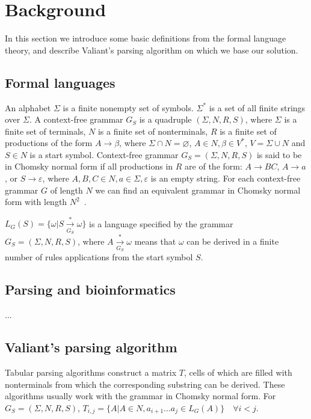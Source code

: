 \section{Background}

In this section we introduce some basic definitions from the formal language theory, and describe Valiant's parsing algorithm on which we base our solution.

\subsection{Formal languages}

An alphabet $\Sigma$ is a finite nonempty set of symbols.
$\Sigma^{*}$ is a set of all finite strings over $\Sigma$.
A context-free grammar $G_S$ is a quadruple $(\Sigma, N, R, S)$, where $\Sigma$ is a finite set of terminals, $N$ is a finite set of nonterminals, $R$ is a finite set of productions of the form $A \rightarrow \beta$, where $\Sigma \cap N = \varnothing$, $A \in N, \beta \in V^{*}$, $V = \Sigma \cup N$ and $S \in N$ is a start symbol.
Context-free grammar $G_S = (\Sigma, N, R, S)$ is said to be in Chomsky normal form if all productions in $R$ are of the form: $A \rightarrow BC$, $A \rightarrow a$, or $S \rightarrow \varepsilon$, where $A, B, C \in N, a \in \Sigma, \varepsilon$ is an empty string.
For each context-free grammar $G$ of length $N$ we can find an equivalent grammar in Chomsky normal form with length $N^2$~\cite{hopcroft2008introduction}.

$L_{G}(S) = \{ \omega | S\xrightarrow[G_S]{*} \omega\}$ is a language specified by the grammar $G_{S} = (\Sigma, N, R, S)$, where $A \xrightarrow[G_S]{*} \omega$ means that $\omega$ can be derived in a finite number of rules applications from the start symbol $S$.

\subsection{Parsing and bioinformatics}

...

\subsection{Valiant's parsing algorithm}

Tabular parsing algorithms construct a matrix $T$, cells of which are filled with nonterminals from which the corresponding substring can be derived. 
These algorithms usually work with the grammar in Chomsky normal form.
For $G_S=(\Sigma, N, R, S)$, $T_{i, j} =  \{ A | A \in N, a_{i + 1} \dots a_{j} \in L_{G}(A)\} \quad \forall i < j$.

